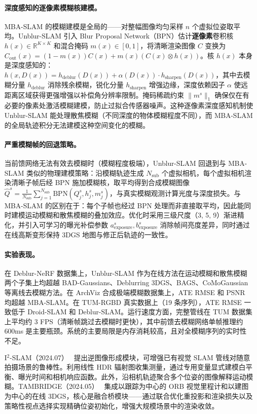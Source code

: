 \paragraph{深度感知的逐像素模糊核建模。}
MBA-SLAM 的模糊建模是全局的——对整幅图像均匀采样 $n$ 个虚拟位姿取平均。Unblur-SLAM 引入 Blur Proposal Network（BPN）估计\textbf{逐像素}卷积核 $h(x) \in \mathbb{R}^{K \times K}$ 和混合掩码 $m(x) \in [0,1]$，将清晰渲染图像 $C$ 变换为 $C_\text{out}(x) = (1-m(x))C(x) + m(x)(C(x) \otimes h(x))$。核 $h(x)$ 本身是深度感知的：$h(x, D(x)) = h_\text{deblur}(D(x)) + \alpha(D(x)) \cdot h_\text{sharpen}(D(x))$，其中去模糊分量 $h_\text{deblur}$ 消除残余模糊，锐化分量 $h_\text{sharpen}$ 增强边缘，深度依赖因子 $\alpha$ 使远距离区域获得更强增强以补偿角分辨率限制。掩码稀疏约束 $\|m^s\|_1$ 确保仅在有必要的像素处激活模糊建模，防止过拟合传感器噪声。这种逐像素深度感知机制使 Unblur-SLAM 能处理散焦模糊（不同深度的物体模糊程度不同），而 MBA-SLAM 的全局轨迹积分无法建模这种空间变化的模糊。

\paragraph{严重模糊帧的回退策略。}
当前馈网络无法有效去模糊时（模糊程度极端），Unblur-SLAM 回退到与 MBA-SLAM 类似的物理建模策略：沿模糊轨迹生成 $N_\text{sub}$ 个虚拟相机，每个虚拟相机渲染清晰子帧后经 BPN 施加模糊核，取平均得到合成模糊图像 $\hat{Q}^s = \frac{1}{N_\text{sub}} \sum_{j=1}^{N_\text{sub}} \text{BPN}(Q_j^s, h_j^s, m_j^s)$，与真实模糊观测计算光度与深度损失。与 MBA-SLAM 的区别在于：每个子帧也经过 BPN 处理而非直接取平均，因此能同时建模运动模糊和散焦模糊的叠加效应。优化时采用三级尺度（3, 5, 9）渐进精化，并引入可学习的曝光补偿参数 $a_\text{exposure}^s, b_\text{exposure}^s$ 消除帧间亮度差异，同时通过在线高斯变形保持 3DGS 地图与修正后轨迹的一致性。

\paragraph{实验表现。}
在 Deblur-NeRF 数据集上，Unblur-SLAM 作为在线方法在运动模糊和散焦模糊两个子集上均超越 BAD-Gaussians、Deblurring 3DGS、BAGS、CoMoGaussian 等离线去模糊方法。在 ArchViz 合成极端模糊数据集上，ATE RMSE 和 PSNR 均超越 MBA-SLAM。在 TUM-RGBD 真实数据上（19 条序列），ATE RMSE 一致低于 Droid-SLAM 和 Deblur-SLAM。运行速度方面，完整管线在 TUM 数据集上平均约 3 FPS（清晰帧跳过去模糊时更快），其中前馈去模糊网络单帧推理约 600ms 是主要瓶颈。系统的主要局限是内存消耗较高，且对全模糊序列的实时性不足。

I$^2$-SLAM（2024.07）~\cite{2407_11347} 提出逆图像形成模块，可增强已有视觉 SLAM 管线对随意拍摄场景的鲁棒性。利用线性 HDR 辐射图收集测量，通过专用变量显式建模白平衡、曝光时间和相机响应函数。此外，沿相机轨迹聚合多个位姿的图像解释运动模糊。TAMBRIDGE（2024.05）~\cite{2405_19614} 集成以跟踪为中心的 ORB 视觉里程计和以建图为中心的在线 3DGS，核心是融合桥模块——通过联合优化重投影和渲染损失以及策略性视点选择实现精确位姿初始化，增强大规模场景中的渲染收敛。


